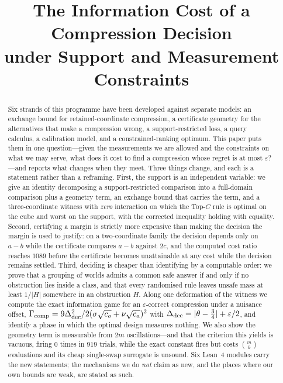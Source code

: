 



\title{The Information Cost of a Compression Decision\\
under Support and Measurement Constraints}

\author{
}

\maketitle

\begin{abstract}
Six strands of this programme have been developed against separate models: an exchange
bound for retained-coordinate compression, a certificate geometry for the alternatives
that make a compression wrong, a support-restricted loss, a query calculus, a calibration
model, and a constrained-ranking optimum. This paper puts them in one question---given the
measurements we are allowed and the constraints on what we may serve, what does it cost to
find a compression whose regret is at most $\varepsilon$?---and reports what changes when
they meet. Three things change, and each is a statement rather than a reframing. First, the
support is an independent variable: we give an identity decomposing a support-restricted
comparison into a full-domain comparison plus a geometry term, an exchange bound that
carries the term, and a three-coordinate witness with \emph{zero} interaction on which the
Top-$C$ rule is optimal on the cube and worst on the support, with the corrected inequality
holding with equality. Second, certifying a margin is strictly more expensive than making
the decision the margin is used to justify: on a two-coordinate family the decision depends
only on $a-b$ while the certificate compares $a-b$ against $2c$, and the computed cost
ratio reaches $1089$ before the certificate becomes unattainable at any cost while the
decision remains settled. Third, deciding is cheaper than identifying by a computable
order: we prove that a grouping of worlds admits a common safe answer if and only if no
obstruction lies inside a class, and that every randomised rule leaves unsafe mass at least
$1/|H|$ somewhere in an obstruction $H$. Along one deformation of the witness we compute
the exact information game for an $\varepsilon$-correct compression under a nuisance
offset, $\Gamma_{\rm comp}=9\Delta_{\rm dec}^{2}/2(\sigma\sqrt{c_{o}}+\nu\sqrt{c_{a}})^{2}$
with $\Delta_{\rm dec}=|\theta-\tfrac34|+\varepsilon/2$, and identify a phase in which the
optimal design measures nothing. We also show the geometry term is measurable from $2m$ oscillations---and that the
criterion this yields is vacuous, firing $0$ times in $919$ trials, while the exact constant
fires but costs $\binom{m}{k}$ evaluations and its cheap single-swap surrogate is unsound.
Six Lean~4 modules carry the new statements; the mechanisms we do \emph{not} claim as new,
and the places where our own bounds are weak, are stated as such.
\end{abstract}

